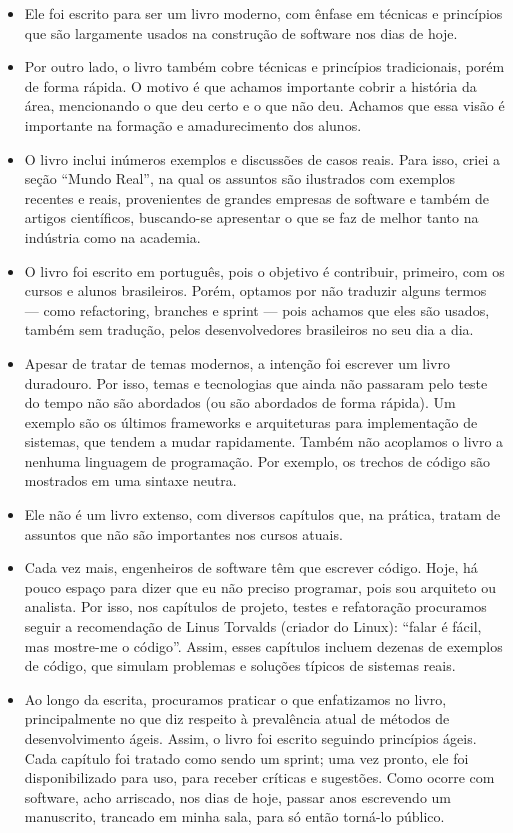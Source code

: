 \documentclass[
  11pt,
  twoside]{book}
\begin{document}
\begin{itemize}
\item
  Ele foi escrito para ser um livro moderno, com ênfase em técnicas e
  princípios que são largamente usados na construção de software nos
  dias de hoje.
\item
  Por outro lado, o livro também cobre técnicas e princípios
  tradicionais, porém de forma rápida. O motivo é que achamos importante
  cobrir a história da área, mencionando o que deu certo e o que não
  deu. Achamos que essa visão é importante na formação e amadurecimento
  dos alunos.
\item
  O livro inclui inúmeros exemplos e discussões de casos reais. Para
  isso, criei a seção ``Mundo Real'', na qual os assuntos são ilustrados
  com exemplos recentes e reais, provenientes de grandes empresas de
  software e também de artigos científicos, buscando-se apresentar o que
  se faz de melhor tanto na indústria como na academia.
\item
  O livro foi escrito em português, pois o objetivo é contribuir,
  primeiro, com os cursos e alunos brasileiros. Porém, optamos por não
  traduzir alguns termos --- como refactoring, branches e sprint ---
  pois achamos que eles são usados, também sem tradução, pelos
  desenvolvedores brasileiros no seu dia a dia.
\item
  Apesar de tratar de temas modernos, a intenção foi escrever um livro
  duradouro. Por isso, temas e tecnologias que ainda não passaram pelo
  teste do tempo não são abordados (ou são abordados de forma rápida).
  Um exemplo são os últimos frameworks e arquiteturas para implementação
  de sistemas, que tendem a mudar rapidamente. Também não acoplamos o
  livro a nenhuma linguagem de programação. Por exemplo, os trechos de
  código são mostrados em uma sintaxe neutra.
\item
  Ele não é um livro extenso, com diversos capítulos que, na prática,
  tratam de assuntos que não são importantes nos cursos atuais.
\item
  Cada vez mais, engenheiros de software têm que escrever código. Hoje,
  há pouco espaço para dizer que eu não preciso programar, pois sou
  arquiteto ou analista. Por isso, nos capítulos de projeto, testes e
  refatoração procuramos seguir a recomendação de Linus Torvalds
  (criador do Linux): ``falar é fácil, mas mostre-me o código''. Assim,
  esses capítulos incluem dezenas de exemplos de código, que simulam
  problemas e soluções típicos de sistemas reais.
\item
  Ao longo da escrita, procuramos praticar o que enfatizamos no livro,
  principalmente no que diz respeito à prevalência atual de métodos de
  desenvolvimento ágeis. Assim, o livro foi escrito seguindo princípios
  ágeis. Cada capítulo foi tratado como sendo um sprint; uma vez pronto,
  ele foi disponibilizado para uso, para receber críticas e sugestões.
  Como ocorre com software, acho arriscado, nos dias de hoje, passar
  anos escrevendo um manuscrito, trancado em minha sala, para só então
  torná-lo público.
\end{itemize}
\end{document}

